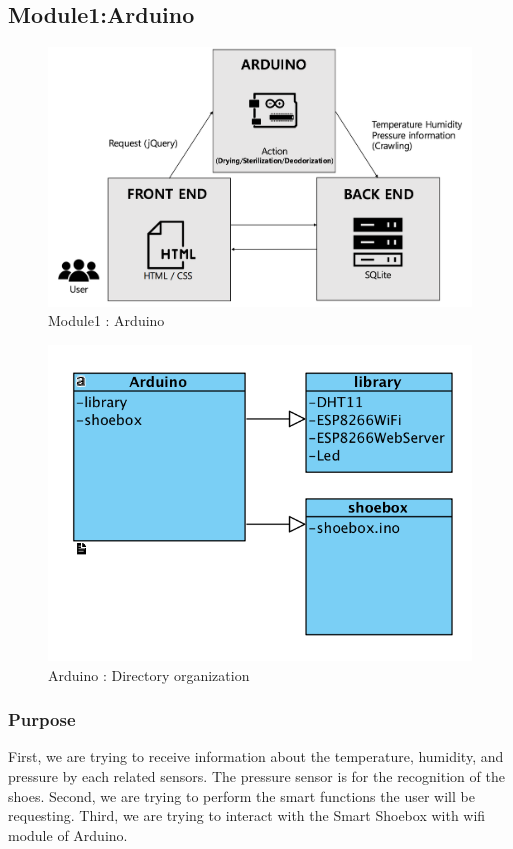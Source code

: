 \documentclass[conference]{IEEEtran}
\begin{document}
\subsection{Module1:Arduino}
\begin{figure}[H]
\begin{center}
    \includegraphics[scale=0.35]{module1}
    \caption{Module1 : Arduino} \label{fig:label}
\end{center}
\end{figure}
\begin{figure}[H]
\begin{center}
    \includegraphics[scale=0.7]{directory2}
   \caption{Arduino : Directory organization}\label{fig:label}
\end{center}
\end{figure}
\subsubsection{Purpose} First, we are trying to receive information about the temperature, humidity, and pressure by each related sensors. The pressure sensor is for the recognition of the shoes. Second, we are trying to perform the smart functions the user will be requesting. Third, we are trying to interact with the Smart Shoebox with wifi module of Arduino.
\end{document}
